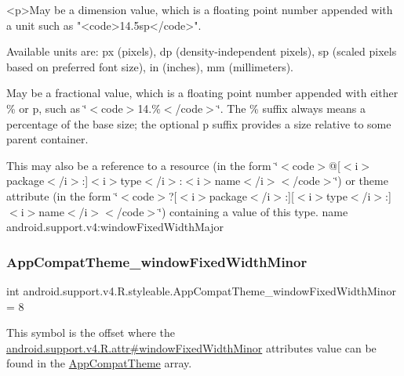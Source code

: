 \begin{DoxyVerb}      <p>May be a dimension value, which is a floating point number appended with a unit such as "<code>14.5sp</code>".
\end{DoxyVerb}
 Available units are\+: px (pixels), dp (density-\/independent pixels), sp (scaled pixels based on preferred font size), in (inches), mm (millimeters). 

May be a fractional value, which is a floating point number appended with either \% or p, such as \char`\"{}$<$code$>$14.\%$<$/code$>$\char`\"{}. The \% suffix always means a percentage of the base size; the optional p suffix provides a size relative to some parent container. 

This may also be a reference to a resource (in the form \char`\"{}$<$code$>$@\mbox{[}$<$i$>$package$<$/i$>$\+:\mbox{]}$<$i$>$type$<$/i$>$\+:$<$i$>$name$<$/i$>$$<$/code$>$\char`\"{}) or theme attribute (in the form \char`\"{}$<$code$>$?\mbox{[}$<$i$>$package$<$/i$>$\+:\mbox{]}\mbox{[}$<$i$>$type$<$/i$>$\+:\mbox{]}$<$i$>$name$<$/i$>$$<$/code$>$\char`\"{}) containing a value of this type.  name android.\+support.\+v4\+:window\+Fixed\+Width\+Major \mbox{\label{classandroid_1_1support_1_1v4_1_1R_1_1styleable_af5b499ea473560087fcc1a5241132837}} 
\subsubsection{\texorpdfstring{App\+Compat\+Theme\+\_\+window\+Fixed\+Width\+Minor}{AppCompatTheme\_windowFixedWidthMinor}}
{\footnotesize\ttfamily int android.\+support.\+v4.\+R.\+styleable.\+App\+Compat\+Theme\+\_\+window\+Fixed\+Width\+Minor = 8\hspace{0.3cm}{\ttfamily [static]}}

This symbol is the offset where the \hyperlink{classandroid_1_1support_1_1v4_1_1R_1_1attr_af403718d44d96e714cbf73376eff3f80}{android.\+support.\+v4.\+R.\+attr\#window\+Fixed\+Width\+Minor} attribute\textquotesingle{}s value can be found in the \hyperlink{classandroid_1_1support_1_1v4_1_1R_1_1styleable_ac07ebbe62ed977f6dcaadc6397840ace}{App\+Compat\+Theme} array.

